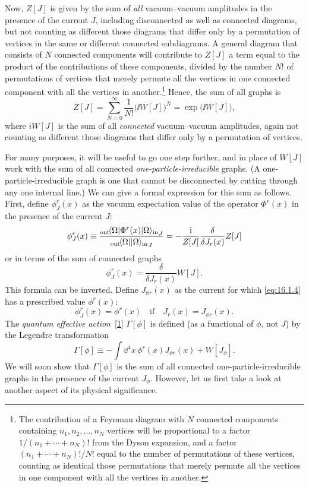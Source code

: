Now, $Z[J]$ is given by the sum of \emph{all} vacuum--vacuum amplitudes in
the presence of the current $J$, including disconnected as well as connected
diagrams, but not counting as different those diagrams that differ only
by a permutation of vertices in the same or different connected subdiagrams.
A general diagram that consists of $N$ connected components will
contribute to $Z[J]$ a term equal to the product of the contributions of
these components, divided by the number $N!$ of permutations of vertices
that merely permute all the vertices in one connected component with all
the vertices in another.\footnote{The contribution of a Feynman diagram with $N$ connected components containing
$n_1,n_2,\ldots,n_N$ vertices will be proportional to a factor $1/(n_1+\cdots+n_N)!$ from the Dyson
expansion, and a factor $(n_1+\cdots+n_N)!/N!$ equal to the number of permutations of these
vertices, counting as identical those permutations that merely permute all the vertices
in one component with all the vertices in another.} Hence, the sum of all graphs is
\begin{equation}
Z[J]=\sum_{N=0}^{\infty}\frac{1}{N!}\bigl(\ii W[J]\bigr)^N
=\exp\bigl(\ii W[J]\bigr),
\label{eq:16.1.3}
\end{equation}
where $iW[J]$ is the sum of all \emph{connected} vacuum--vacuum amplitudes, again
not counting as different those diagrams that differ only by a permutation
of vertices.

For many purposes, it will be useful to go one step further, and in place
of $W[J]$ work with the sum of all connected \emph{one-particle-irreducible} graphs.
(A one-particle-irreducible graph is one that cannot be disconnected by
cutting through any one internal line.) We can give a formal expression
for this sum as follows. First, define $\phi_J^r(x)$ as the vacuum expectation
value of the operator $\Phi^r(x)$ in the presence of the current $J$:
\begin{equation}
\phi_J^r(x)\equiv
\frac{{}_{\mathrm{out}}\!\langle \Omega\rvert\Phi^r(x){\lvert \Omega\rangle_{\mathrm{in}}}_J}
{{{}_{\mathrm{out}}\!\langle \Omega\rvert\lvert \Omega\rangle_{\mathrm{in}}}_J}
=-\frac{\mathrm{i}}{Z[J]}\frac{\delta}{\delta J_r(x)}Z[J]
\label{eq:16.1.4}
\end{equation}
or in terms of the sum of connected graphs
\begin{equation}
\phi_J^r(x)=\frac{\delta}{\delta J_r(x)}W[J].
\label{eq:16.1.5}
\end{equation}
This formula can be inverted. Define $J_{\phi r}(x)$ as the current for which
\eqref{eq:16.1.4} has a prescribed value $\phi^r(x)$:
\[
\phi_J^r(x)=\phi^r(x)\quad\text{if}\quad J_r(x)=J_{\phi r}(x).
\]
The \emph{quantum effective action}~\hyperref[ch16-ref-1]{[1]} $\Gamma[\phi]$ is defined (as a functional of $\phi$, not $J$)
by the Legendre transformation
\begin{equation}
\Gamma[\phi]\equiv-\int \dd^4x\,\phi^r(x)J_{\phi r}(x)+W[J_\phi].
\label{eq:16.1.6}
\end{equation}
We will soon show that $\Gamma[\phi]$ is the sum of all connected
one-particle-irreducible graphs in the presence of the current $J_\phi$. However, let us first
take a look at another aspect of its physical significance.


